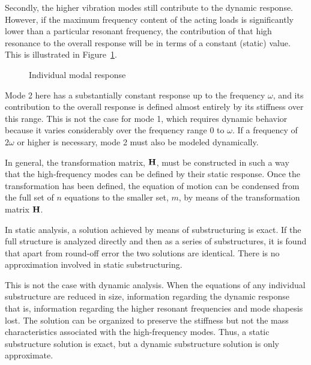 Secondly, the higher vibration modes still contribute to the dynamic response.
However, if the maximum frequency content of the acting loads is significantly
lower than a particular resonant frequency, the contribution of that high
resonance to the overall response will be in terms of a constant (static) value.
This is illustrated in Figure~\ref{fig:freq_response}.
%
\begin{figure}[t]
\caption{Individual modal response}
\label{fig:freq_response}
\end{figure}
%
Mode 2 here has a substantially constant response up to the frequency $\omega$,
and its contribution to the overall response is defined almost entirely by its
stiffness over this range. This is not the case for mode 1, which requires dynamic behavior
because it varies considerably over the frequency range 0 to $\omega$. If a frequency of $2\omega$
or higher is necessary, mode 2 must also be modeled dynamically.

In general, the transformation matrix, $\bf H$, must be constructed in such
a way that the high-frequency modes can be defined by their static response.
Once the transformation has been defined, the equation of motion can be
condensed from the full set of $n$ equations to the smaller set, $m$,
by means of the transformation matrix $\bf H$.

In static analysis, a solution achieved by means of substructuring is exact. If the full structure
is analyzed directly and then as a series of substructures, it is found that apart from round-off
error the two solutions are identical. There is no approximation involved in static substructuring.

This is not the case with dynamic analysis. When the equations of any individual substructure
are reduced in size, information regarding the dynamic response \mdash{}that is, information
regarding the higher resonant frequencies and mode shapes\mdash is lost. The solution can be
organized to preserve the stiffness but not the mass characteristics associated with the high-frequency
modes. Thus, a static substructure solution is exact, but a dynamic substructure solution is
only approximate.

